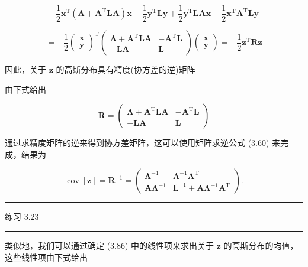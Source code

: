 \documentclass[10pt]{report}
\newcommand{\HRule}{\begin{center}\rule{0.9\linewidth}{0.2mm}\end{center}}
\begin{document}
\[
- \frac{1}{2}{\mathbf{x}}^{\mathrm{T}}\left( {\mathbf{\Lambda } + {\mathbf{A}}^{\mathrm{T}}\mathbf{{LA}}}\right) \mathbf{x} - \frac{1}{2}{\mathbf{y}}^{\mathrm{T}}\mathbf{{Ly}} + \frac{1}{2}{\mathbf{y}}^{\mathrm{T}}\mathbf{{LA}}\mathbf{x} + \frac{1}{2}{\mathbf{x}}^{\mathrm{T}}{\mathbf{A}}^{\mathrm{T}}\mathbf{{Ly}}
\]

\[
=  - \frac{1}{2}{\left( \begin{array}{l} \mathbf{x} \\  \mathbf{y} \end{array}\right) }^{\mathrm{T}}\left( \begin{matrix} \mathbf{\Lambda } + {\mathbf{A}}^{\mathrm{T}}\mathbf{{LA}} &  - {\mathbf{A}}^{\mathrm{T}}\mathbf{L} \\   - \mathbf{{LA}} & \mathbf{L} \end{matrix}\right) \left( \begin{array}{l} \mathbf{x} \\  \mathbf{y} \end{array}\right)  =  - \frac{1}{2}{\mathbf{z}}^{\mathrm{T}}\mathbf{R}\mathbf{z} \tag{3.87}
\]

因此，关于 \(\mathbf{z}\) 的高斯分布具有精度(协方差的逆)矩阵

由下式给出

\[
\mathbf{R} = \left( \begin{matrix} \mathbf{\Lambda } + {\mathbf{A}}^{\mathrm{T}}\mathbf{{LA}} &  - {\mathbf{A}}^{\mathrm{T}}\mathbf{L} \\   - \mathbf{{LA}} & \mathbf{L} \end{matrix}\right)  \tag{3.88}
\]

通过求精度矩阵的逆来得到协方差矩阵，这可以使用矩阵求逆公式 (3.60) 来完成，结果为

\[
\operatorname{cov}\left\lbrack  \mathbf{z}\right\rbrack   = {\mathbf{R}}^{-1} = \left( \begin{matrix} {\mathbf{\Lambda }}^{-1} & {\mathbf{\Lambda }}^{-1}{\mathbf{A}}^{\mathrm{T}} \\  \mathbf{A}{\mathbf{\Lambda }}^{-1} & {\mathbf{L}}^{-1} + \mathbf{A}{\mathbf{\Lambda }}^{-1}{\mathbf{A}}^{\mathrm{T}} \end{matrix}\right) . \tag{3.89}
\]

\HRule

练习 3.23

\HRule

类似地，我们可以通过确定 (3.86) 中的线性项来求出关于 \(\mathbf{z}\) 的高斯分布的均值，这些线性项由下式给出
\end{document}
